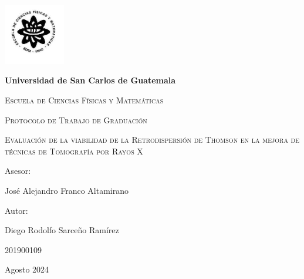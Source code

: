 \centering
{\includegraphics[width=0.2\textwidth]{img/index.jpg}\par}

\vspace{.5cm}
{\bfseries\LARGE Universidad de San Carlos de Guatemala \par}
\vspace{1cm}
{\scshape\Large Escuela de Ciencias Físicas y Matemáticas \par}
\vspace{2cm}
{\scshape\Huge Protocolo de Trabajo de Graduación \par}
\vspace{.5cm}
{\scshape\Huge Evaluación de la viabilidad de la Retrodispersión de Thomson en la mejora de técnicas de Tomografía por Rayos X  \par}

\vspace{1cm}
\vfill
{\Large Asesor: \par}
{\Large José Alejandro Franco Altamirano \par}
\vfill
\vfill
{\Large Autor: \par}
{\Large Diego Rodolfo Sarceño Ramírez \par}

{\Large 201900109 \par}
\vfill
{\Large Agosto 2024 \par}